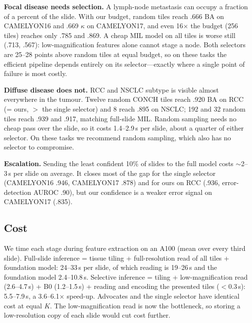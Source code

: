 \documentclass[10pt,twocolumn]{article}
\begin{document}
\textbf{Focal disease needs selection.} A lymph-node metastasis can occupy a fraction of a percent of the slide. With our budget, random tiles reach .666 BA on CAMELYON16 and .669 $\kappa$ on CAMELYON17, and even 16$\times$ the budget (256 tiles) reaches only .785 and .869. A cheap MIL model on all tiles is worse still (.713, .567): low-magnification features alone cannot stage a node. Both selectors are 25--28 points above random tiles at equal budget, so on these tasks the efficient pipeline depends entirely on its selector---exactly where a single point of failure is most costly.

\textbf{Diffuse disease does not.} RCC and NSCLC subtype is visible almost everywhere in the tumour. Twelve random CONCH tiles reach .920 BA on RCC (= ours, $>$ the single selector) and 8 reach .895 on NSCLC; 192 and 32 random tiles reach .939 and .917, matching full-slide MIL. Random sampling needs no cheap pass over the slide, so it costs 1.4--2.9\,s per slide, about a quarter of either selector. On these tasks we recommend random sampling, which also has no selector to compromise.

\textbf{Escalation.} Sending the least confident 10\% of slides to the full model costs $\sim$2--3\,s per slide on average. It closes most of the gap for the single selector (CAMELYON16 .946, CAMELYON17 .878) and for ours on RCC (.936, error-detection AUROC .90), but our confidence is a weaker error signal on CAMELYON17 (.835).

\subsection{Cost}\label{sec:cost}
We time each stage during feature extraction on an A100 (mean over every third slide). Full-slide inference = tissue tiling + full-resolution read of all tiles + foundation model: 24--33\,s per slide, of which reading is 19--26\,s and the foundation model 2.4--10.8\,s. Selective inference = tiling + low-magnification read (2.6--4.7\,s) + B0 (1.2--1.5\,s) + reading and encoding the presented tiles ($<$0.3\,s): 5.5--7.9\,s, a 3.6--6.1$\times$ speed-up. Advocates and the single selector have identical cost at equal $K$. The low-magnification read is now the bottleneck, so storing a low-resolution copy of each slide would cut cost further.
\end{document}

